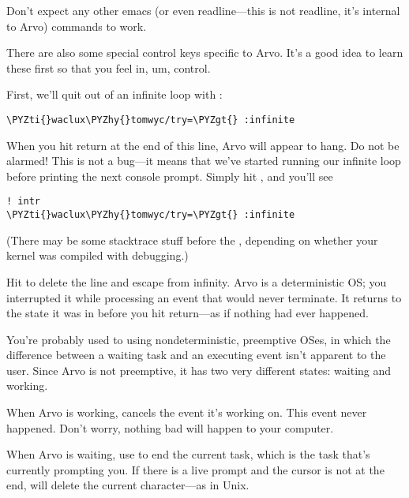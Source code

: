 Don't expect any other emacs (or even readline---this is not readline, it's
internal to Arvo) commands to work.

There are also some special control keys specific to Arvo.  It's
a good idea to learn these first so that you feel in, um,
control.

First, we'll quit out of an infinite loop with :

\begin{framed_shaded}
\begin{Verbatim}[fontsize=\relsize{-2.5},fontseries=b,commandchars=\\\{\}]
\PYZti{}waclux\PYZhy{}tomwyc/try=\PYZgt{} :infinite
\end{Verbatim}
\end{framed_shaded}

When you hit return at the end of this line, Arvo will appear to
hang.  Do not be alarmed!  This is not a bug---it means that
we've started running our infinite loop before printing the next
console prompt.  Simply hit , and you'll see

\begin{framed_shaded}
\begin{Verbatim}[fontsize=\relsize{-2.5},fontseries=b,commandchars=\\\{\}]
! intr
\PYZti{}waclux\PYZhy{}tomwyc/try=\PYZgt{} :infinite
\end{Verbatim}
\end{framed_shaded}

(There may be some stacktrace stuff before the , depending
on whether your kernel was compiled with debugging.)

Hit  to delete the line and escape from infinity.  Arvo is a
deterministic OS; you interrupted it while processing an event
that would never terminate.  It returns to the state it was in
before you hit return---as if nothing had ever happened.

You're probably used to using nondeterministic, preemptive OSes,
in which the difference between a waiting task and an
executing event isn't apparent to the user.  Since Arvo is not
preemptive, it has two very different states: waiting and
working.

When Arvo is working,  cancels the event it's working on.
This event never happened.  Don't worry, nothing bad will happen
to your computer.

When Arvo is waiting, use  to end the current task, which is
the task that's currently prompting you.  If there is a live
prompt and the cursor is not at the end,  will delete the
current character---as in Unix.

